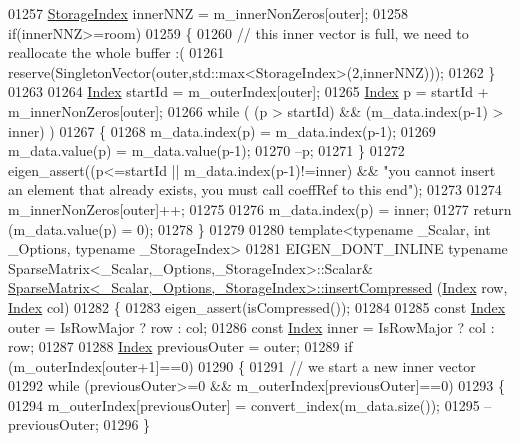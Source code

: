 \begin{DoxyCode}
01257   \hyperlink{group___sparse_core___module_a0b540ba724726ebe953f8c0df06081ed}{StorageIndex} innerNNZ = m\_innerNonZeros[outer];
01258   \textcolor{keywordflow}{if}(innerNNZ>=room)
01259   \{
01260     \textcolor{comment}{// this inner vector is full, we need to reallocate the whole buffer :(}
01261     reserve(SingletonVector(outer,std::max<StorageIndex>(2,innerNNZ)));
01262   \}
01263 
01264   \hyperlink{group___core___module_a554f30542cc2316add4b1ea0a492ff02}{Index} startId = m\_outerIndex[outer];
01265   \hyperlink{group___core___module_a554f30542cc2316add4b1ea0a492ff02}{Index} p = startId + m\_innerNonZeros[outer];
01266   \textcolor{keywordflow}{while} ( (p > startId) && (m\_data.index(p-1) > inner) )
01267   \{
01268     m\_data.index(p) = m\_data.index(p-1);
01269     m\_data.value(p) = m\_data.value(p-1);
01270     --p;
01271   \}
01272   eigen\_assert((p<=startId || m\_data.index(p-1)!=inner) && \textcolor{stringliteral}{"you cannot insert an element that already
       exists, you must call coeffRef to this end"});
01273 
01274   m\_innerNonZeros[outer]++;
01275 
01276   m\_data.index(p) = inner;
01277   \textcolor{keywordflow}{return} (m\_data.value(p) = 0);
01278 \}
01279 
01280 \textcolor{keyword}{template}<\textcolor{keyword}{typename} \_Scalar, \textcolor{keywordtype}{int} \_Options, \textcolor{keyword}{typename} \_StorageIndex>
01281 EIGEN\_DONT\_INLINE \textcolor{keyword}{typename} SparseMatrix<\_Scalar,\_Options,\_StorageIndex>::Scalar& 
      \hyperlink{group___sparse_core___module_class_eigen_1_1_sparse_matrix}{SparseMatrix<\_Scalar,\_Options,\_StorageIndex>::insertCompressed}
      (\hyperlink{group___core___module_a554f30542cc2316add4b1ea0a492ff02}{Index} row, \hyperlink{group___core___module_a554f30542cc2316add4b1ea0a492ff02}{Index} col)
01282 \{
01283   eigen\_assert(isCompressed());
01284 
01285   \textcolor{keyword}{const} \hyperlink{group___core___module_a554f30542cc2316add4b1ea0a492ff02}{Index} outer = IsRowMajor ? row : col;
01286   \textcolor{keyword}{const} \hyperlink{group___core___module_a554f30542cc2316add4b1ea0a492ff02}{Index} inner = IsRowMajor ? col : row;
01287 
01288   \hyperlink{group___core___module_a554f30542cc2316add4b1ea0a492ff02}{Index} previousOuter = outer;
01289   \textcolor{keywordflow}{if} (m\_outerIndex[outer+1]==0)
01290   \{
01291     \textcolor{comment}{// we start a new inner vector}
01292     \textcolor{keywordflow}{while} (previousOuter>=0 && m\_outerIndex[previousOuter]==0)
01293     \{
01294       m\_outerIndex[previousOuter] = convert\_index(m\_data.size());
01295       --previousOuter;
01296     \}

\end{DoxyCode}
